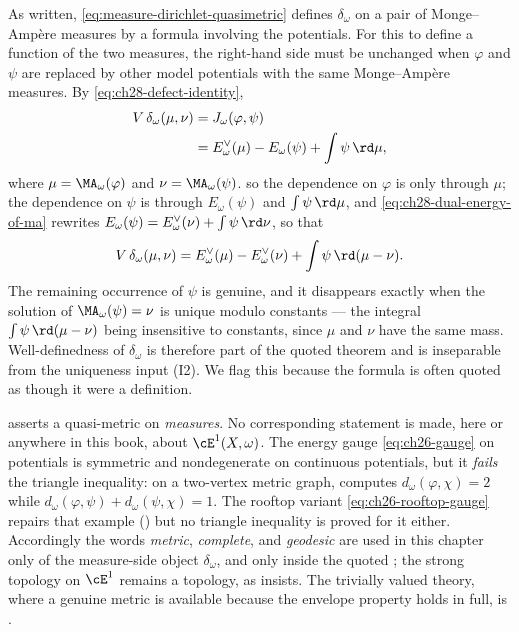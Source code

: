 \begin{remark}
\label{rem:ch28-quasimetric-well-defined}
As written, \eqref{eq:measure-dirichlet-quasimetric} defines
\(\delta_\omega\) on a pair of Monge--Amp\`ere measures by a formula
involving the potentials.  For this to define a function of the two
measures, the right-hand side must be unchanged when \(\varphi\) and
\(\psi\) are replaced by other model potentials with the same
Monge--Amp\`ere measures.  By \eqref{eq:ch28-defect-identity},
\[
 \begin{aligned}
 V\,\delta_\omega(\mu,\nu)
 &=J_\omega(\varphi,\psi)\\
 &=E^\vee_\omega(\mu)-E_\omega(\psi)+\int\psi\,\rd\mu,
 \end{aligned}
\]
where \(\mu=\MA_\omega(\varphi)\) and \(\nu=\MA_\omega(\psi)\).
so the dependence on \(\varphi\) is only through \(\mu\); the dependence on
\(\psi\) is through \(E_\omega(\psi)\) and \(\int\psi\,\rd\mu\), and
\eqref{eq:ch28-dual-energy-of-ma} rewrites
\(E_\omega(\psi)=E^\vee_\omega(\nu)+\int\psi\,\rd\nu\), so that
\[
 V\,\delta_\omega(\mu,\nu)
 =E^\vee_\omega(\mu)-E^\vee_\omega(\nu)
   +\int\psi\,\rd(\mu-\nu).
\]
The remaining occurrence of \(\psi\) is genuine, and it disappears exactly
when the solution of \(\MA_\omega(\psi)=\nu\) is unique modulo constants ---
the integral \(\int\psi\,\rd(\mu-\nu)\) being insensitive to constants,
since \(\mu\) and \(\nu\) have the same mass.  Well-definedness of
\(\delta_\omega\) is therefore part of the quoted theorem and is
inseparable from the uniqueness input \textup{(I2)}.  We flag this because
the formula is often quoted as though it were a definition.
\end{remark}

\begin{remark}
\label{rem:ch28-not-a-metric-on-potentials}
 asserts a quasi-metric on
\emph{measures}.  No corresponding statement is made, here or anywhere in
this book, about \(\cE^1(X,\omega)\).  The energy gauge
\eqref{eq:ch26-gauge} on potentials is symmetric and nondegenerate on
continuous potentials, but it \emph{fails} the triangle inequality: on a
two-vertex metric graph,  computes
\(d_\omega(\varphi,\chi)=2\) while
\(d_\omega(\varphi,\psi)+d_\omega(\psi,\chi)=1\).  The rooftop variant
\eqref{eq:ch26-rooftop-gauge} repairs that example
() but no triangle inequality is proved for it
either.  Accordingly the words \emph{metric}, \emph{complete}, and
\emph{geodesic} are used in this chapter only of the measure-side object
\(\delta_\omega\), and only inside the quoted
; the strong topology on
\(\cE^1\) remains a topology, as  insists.  The
trivially valued theory, where a genuine metric is available because the
envelope property holds in full, is .
\end{remark}

